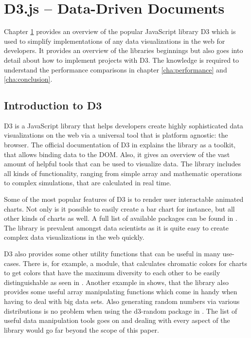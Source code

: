 \chapter{D3.js – Data-Driven Documents}
\label{cha:d3js}

Chapter \ref{cha:d3js} provides an overview of the popular JavaScript library D3 which is used to simplify implementations of any data visualizations in the web for developers. It provides an overview of the libraries beginnings but also goes into detail about how to implement projects with D3. The knowledge is required to understand the performance comparisons in chapter \ref{cha:performance} and \ref{cha:conclusion}.


\section{Introduction to D3}

D3 is a JavaScript library that helps developers create highly sophisticated data visualizations on the web via a universal tool that is platform agnostic: the browser. The official documentation of D3 in \cite{D3Website} explains the library as a toolkit, that allows binding data to the DOM. Also, it gives an overview of the vast amount of helpful tools that can be used to visualize data. The library includes all kinds of functionality, ranging from simple array and mathematic operations to complex simulations, that are calculated in real time.

Some of the most popular features of D3 is to render user interactable animated charts. Not only is it possible to easily create a bar chart for instance, but all other kinds of charts as well. A full list of available packages can be found in \cite{D3Github}. The library is prevalent amongst data scientists as it is quite easy to create complex data visualizations in the web quickly.

D3 also provides some other utility functions that can be useful in many use-cases. There is, for example, a module, that calculates chromatic colors for charts to get colors that have the maximum diversity to each other to be easily distinguishable as seen in \cite[/d3-scale-chromatic]{D3Github}. Another example in \cite[/d3-array]{D3Github} shows, that the library also provides some useful array manipulating functions which come in handy when having to deal with big data sets. Also generating random numbers via various distributions is no problem when using the d3-random package in \cite[/d3-random]{D3Github}. The list of useful data manipulation tools goes on and dealing with every aspect of the library would go far beyond the scope of this paper. 


